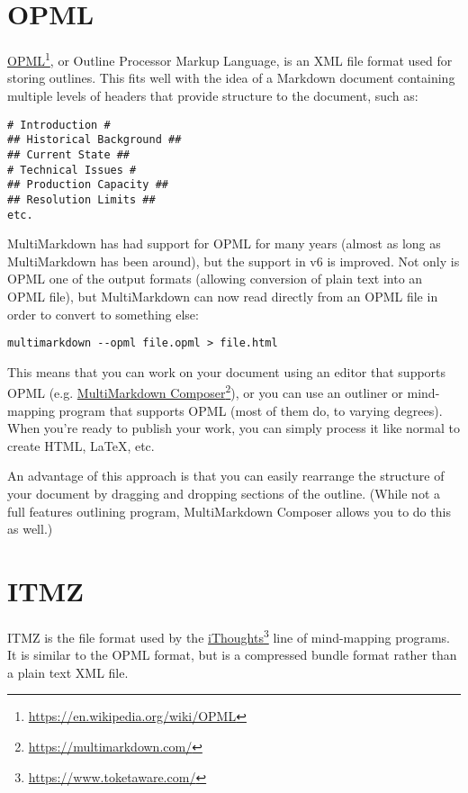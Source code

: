 \section{OPML}
\label{opml}

\href{https://en.wikipedia.org/wiki/OPML}{OPML}\footnote{\href{https://en.wikipedia.org/wiki/OPML}{https:\slash{}\slash{}en.wikipedia.org\slash{}wiki\slash{}OPML}}, or Outline Processor Markup Language, is an XML file format used for storing outlines. This fits well with the idea of a Markdown document containing multiple levels of headers that provide structure to the document, such as:

\begin{verbatim}
# Introduction #
## Historical Background ##
## Current State ##
# Technical Issues #
## Production Capacity ##
## Resolution Limits ##
etc.
\end{verbatim}

MultiMarkdown has had support for OPML for many years (almost as long as MultiMarkdown has been around), but the support in v6 is improved. Not only is OPML one of the output formats (allowing conversion of plain text into an OPML file), but MultiMarkdown can now read directly from an OPML file in order to convert to something else:

\begin{verbatim}
multimarkdown --opml file.opml > file.html
\end{verbatim}

This means that you can work on your document using an editor that supports OPML (e.g. \href{https://multimarkdown.com/}{MultiMarkdown Composer}\footnote{\href{https://multimarkdown.com/}{https:\slash{}\slash{}multimarkdown.com\slash{}}}), or you can use an outliner or mind-mapping program that supports OPML (most of them do, to varying degrees). When you're ready to publish your work, you can simply process it like normal to create HTML, LaTeX, etc.

An advantage of this approach is that you can easily rearrange the structure of your document by dragging and dropping sections of the outline. (While not a full features outlining program, MultiMarkdown Composer allows you to do this as well.)

\section{ITMZ}
\label{itmz}

ITMZ is the file format used by the \href{https://www.toketaware.com/}{iThoughts}\footnote{\href{https://www.toketaware.com/}{https:\slash{}\slash{}www.toketaware.com\slash{}}} line of mind-mapping programs. It is similar to the OPML format, but is a compressed bundle format rather than a plain text XML file.

